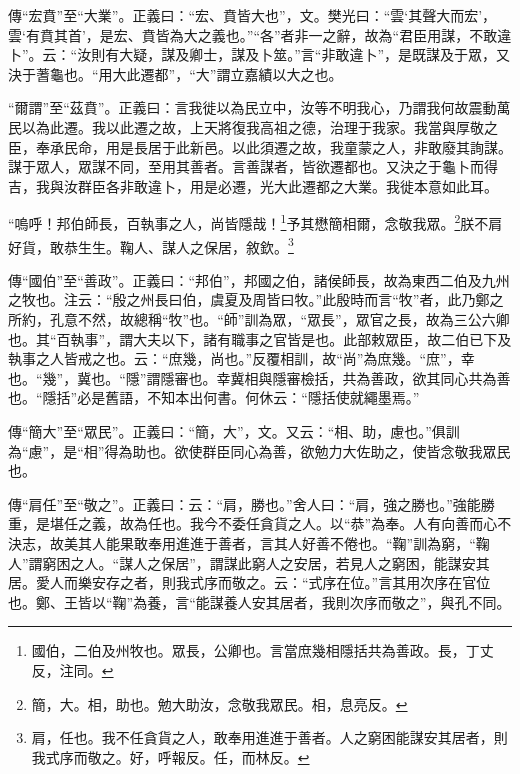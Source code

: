 {\noindent\zhuan{}\fzbyks 傳“宏賁”至“大業”。正義曰：“宏、賁皆大也”，文。樊光曰：“雲‘其聲大而宏’，雲‘有賁其首’，是宏、賁皆為大之義也。”“各”者非一之辭，故為“君臣用謀，不敢違卜”。云：“汝則有大疑，謀及卿士，謀及卜筮。”言“非敢違卜”，是既謀及于眾，又決于蓍龜也。“用大此遷都”，“大”謂立嘉績以大之也。 \par}

{\noindent\shu{}\fzkt “爾謂”至“茲賁”。正義曰：言我徙以為民立中，汝等不明我心，乃謂我何故震動萬民以為此遷。我以此遷之故，上天將復我高祖之德，治理于我家。我當與厚敬之臣，奉承民命，用是長居于此新邑。以此須遷之故，我童蒙之人，非敢廢其詢謀。謀于眾人，眾謀不同，至用其善者。言善謀者，皆欲遷都也。又決之于龜卜而得吉，我與汝群臣各非敢違卜，用是必遷，光大此遷都之大業。我徙本意如此耳。 \par}

“嗚呼！邦伯師長，百執事之人，尚皆隱哉！\footnote{國伯，二伯及州牧也。眾長，公卿也。言當庶幾相隱括共為善政。長，丁丈反，注同。}予其懋簡相爾，念敬我眾。\footnote{簡，大。相，助也。勉大助汝，念敬我眾民。相，息亮反。}朕不肩好貨，敢恭生生。鞠人、謀人之保居，敘欽。\footnote{肩，任也。我不任貪貨之人，敢奉用進進于善者。人之窮困能謀安其居者，則我式序而敬之。好，呼報反。任，而林反。}

{\noindent\zhuan{}\fzbyks 傳“國伯”至“善政”。正義曰：“邦伯”，邦國之伯，諸侯師長，故為東西二伯及九州之牧也。注云：“殷之州長曰伯，虞夏及周皆曰牧。”此殷時而言“牧”者，此乃鄭之所約，孔意不然，故總稱“牧”也。“師”訓為眾，“眾長”，眾官之長，故為三公六卿也。其“百執事”，謂大夫以下，諸有職事之官皆是也。此部敕眾臣，故二伯已下及執事之人皆戒之也。云：“庶幾，尚也。”反覆相訓，故“尚”為庶幾。“庶”，幸也。“幾”，冀也。“隱”謂隱審也。幸冀相與隱審檢括，共為善政，欲其同心共為善也。“隱括”必是舊語，不知本出何書。何休云：“隱括使就繩墨焉。” \par}

{\noindent\zhuan{}\fzbyks 傳“簡大”至“眾民”。正義曰：“簡，大”，文。又云：“相、助，慮也。”俱訓為“慮”，是“相”得為助也。欲使群臣同心為善，欲勉力大佐助之，使皆念敬我眾民也。 \par}

{\noindent\zhuan{}\fzbyks 傳“肩任”至“敬之”。正義曰：云：“肩，勝也。”舍人曰：“肩，強之勝也。”強能勝重，是堪任之義，故為任也。我今不委任貪貨之人。以“恭”為奉。人有向善而心不決志，故美其人能果敢奉用進進于善者，言其人好善不倦也。“鞠”訓為窮，“鞠人”謂窮困之人。“謀人之保居”，謂謀此窮人之安居，若見人之窮困，能謀安其居。愛人而樂安存之者，則我式序而敬之。云：“式序在位。”言其用次序在官位也。鄭、王皆以“鞠”為養，言“能謀養人安其居者，我則次序而敬之”，與孔不同。 \par}

